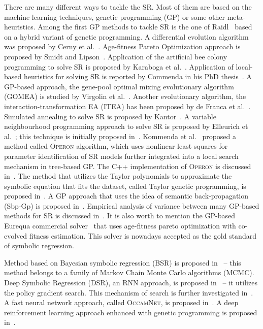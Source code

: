 \documentclass[a4paper,12pt]{elsarticle}
\begin{document}
	There are many different ways to tackle the SR. Most of them are based on the machine learning techniques, genetic programming (GP) or some other meta-heuristics. Among the first GP methods to tackle SR is the one of Raidl~\cite{raidl1998hybrid} based on a hybrid variant of genetic programming. A differential evolution algorithm was proposed by Cerny et al.~\cite{cerny2008using}. Age-fitness Pareto Optimization approach is proposed by Smidt and Lipson~\cite{schmidt2010age}.  Application of the artificial bee colony programming to solve SR is proposed by Karaboga et al.~\cite{karaboga2012artificial}. 
	Application of local-based heuristics for solving SR is reported by Commenda in his PhD thesis~\cite{kommenda2018local}. A GP-based approach, the gene-pool optimal mixing evolutionary algorithm (\textsc{GOMEA}) is studied by Virgolin et al.~\cite{virgolin2021improving}.  Another evolutionary algorithm, the interaction-transformation EA (\textsc{ITEA}) has been proposed by de Franca et al.~\cite{de2021interaction}. Simulated annealing to solve SR is proposed by Kantor~\cite{kantor2021simulated}. A variable neighbourhood programming approach to solve SR  is proposed by Elleurich et al.~\cite{elleuch2020variable}; this technique is initially proposed in~\cite{elleuch2016variable}. 
	Kommenda et al.~\cite{kommenda2020parameter} proposed a method called \textsc{Operon} algorithm, which uses nonlinear least squares for parameter identification of SR models further integrated into a local search mechanism in tree-based GP. The C++ implementation of \textsc{Operon} is discussed in~\cite{burlacu2020operon}. The method that utilizes the Taylor polynomials to approximate the symbolic equation that fits the dataset, called Taylor genetic programming, is proposed in~\cite{he2022taylor}. A GP approach that uses the idea of semantic back-propagation (Sbp-Gp) is proposed in~\cite{virgolin2019linear}.  Empirical analysis of variance between many GP-based methods for SR is discussed in~\cite{kammerer2021empirical}. It is also worth to mention the GP-based Eurequa commercial solver~\cite{schmidt2009distilling, schmidt2011machine} that uses age-fitness pareto optimization with co-evolved fitness estimation. This solver is nowadays accepted as the gold standard of symbolic regression.   
	
	Method based on Bayesian symbolic regression (\textsc{BSR}) is proposed in~\cite{jin2019bayesian} -- this method belongs to a family of Markov Chain Monte Carlo algorithms (MCMC). Deep Symbolic Regression (\textsc{DSR}), an RNN approach, is proposed in~\cite{petersen2019deep} -- it utilizes the policy gradient search. This mechanism of search is further investigated in~\cite{landajuela2021improving}. A fast neural network approach, called \textsc{OccamNet},  is proposed in~\cite{costa2020fast}.  A deep reinforcement learning approach enhanced with genetic programming is proposed in~\cite{mundhenk2021symbolic}. 
	
\end{document}
